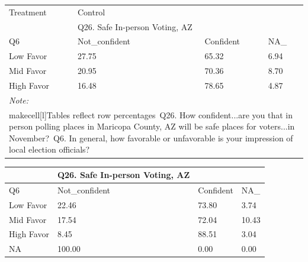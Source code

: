 \documentclass[
  11pt,
  a4paper,
]{article}
\begin{document}
\begin{table}
\centering
\centering
\begin{tabular}[t]{l|l|l|l}
\hline
\multicolumn{1}{l|}{Treatment} & \multicolumn{1}{l}{Control} \\
\cline{1-1} \cline{2-2}
 & Q26. Safe In-person Voting, AZ &  & \\
\hline
Q6 & Not\_confident & Confident & NA\_\\
\hline
Low Favor & 27.75 & 65.32 & 6.94\\
\hline
Mid Favor & 20.95 & 70.36 & 8.70\\
\hline
High Favor & 16.48 & 78.65 & 4.87\\
\hline
\multicolumn{4}{l}{\rule{0pt}{1em}\textit{Note: }}\\
\multicolumn{4}{l}{\rule{0pt}{1em}makecell[l]{Tables reflect row percentages\ Q26. How confident...are you that in person polling places in Maricopa County, AZ will be safe places for voters...in November?\ Q6. In general, how favorable or unfavorable is your impression of local election officials?}}\\
\end{tabular}
\centering
\begin{tabular}[t]{l|l|l|l}
\hline
 & Q26. Safe In-person Voting, AZ &  & \\
\hline
Q6 & Not\_confident & Confident & NA\_\\
\hline
Low Favor & 22.46 & 73.80 & 3.74\\
\hline
Mid Favor & 17.54 & 72.04 & 10.43\\
\hline
High Favor & 8.45 & 88.51 & 3.04\\
\hline
NA & 100.00 & 0.00 & 0.00\\
\hline
\end{tabular}
\end{table}
\end{document}
